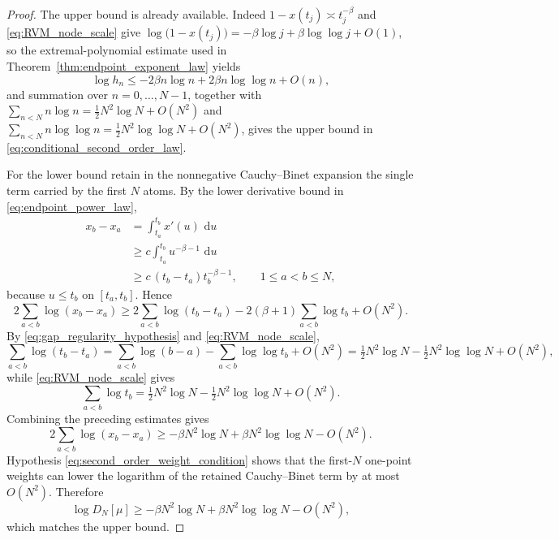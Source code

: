 \documentclass[11pt]{amsart}
\numberwithin{equation}{section}
\theoremstyle{plain}
\theoremstyle{definition}
\theoremstyle{remark}
\newcommand{\dd}{\,\mathrm d}
\begin{document}
\begin{proof}
The upper bound is already available. Indeed $1-x(t_j)\asymp t_j^{-\beta}$ and \eqref{eq:RVM_node_scale} give $\log\bigl(1-x(t_j)\bigr)=-\beta\log j+\beta\log\log j+O(1)$, so the extremal-polynomial estimate used in Theorem~\ref{thm:endpoint_exponent_law} yields
\begin{equation}
\log h_n\le-2\beta n\log n+2\beta n\log\log n+O(n),
\end{equation}
and summation over $n=0,\dots,N-1$, together with $\sum_{n<N}n\log n=\tfrac12N^2\log N+O(N^2)$ and $\sum_{n<N}n\log\log n=\tfrac12N^2\log\log N+O(N^2)$, gives the upper bound in \eqref{eq:conditional_second_order_law}.

For the lower bound retain in the nonnegative Cauchy--Binet expansion the single term carried by the first $N$ atoms.  By the lower derivative bound in \eqref{eq:endpoint_power_law},
\begin{align}
x_b-x_a
&=\int_{t_a}^{t_b}x'(u)\,\dd u\\
&\ge c\int_{t_a}^{t_b}u^{-\beta-1}\,\dd u\\
&\ge c\,(t_b-t_a)t_b^{-\beta-1},
\qquad 1\le a<b\le N,
\label{eq:second_order_node_gap_lower}
\end{align}
because $u\le t_b$ on $[t_a,t_b]$.  Hence
\begin{equation}
2\sum_{a<b}\log(x_b-x_a)
\ge
2\sum_{a<b}\log(t_b-t_a)
-2(\beta+1)\sum_{a<b}\log t_b
+O(N^2).
\label{eq:second_order_vandermonde_lower}
\end{equation}
By \eqref{eq:gap_regularity_hypothesis} and \eqref{eq:RVM_node_scale},
\begin{equation}
\sum_{a<b}\log(t_b-t_a)
=\sum_{a<b}\log(b-a)-\sum_{a<b}\log\log t_b+O(N^2)
=\tfrac12N^2\log N-\tfrac12N^2\log\log N+O(N^2),
\end{equation}
while \eqref{eq:RVM_node_scale} gives
\begin{equation}
\sum_{a<b}\log t_b=\tfrac12N^2\log N-\tfrac12N^2\log\log N+O(N^2).
\end{equation}
Combining the preceding estimates gives
\begin{equation}
2\sum_{a<b}\log(x_b-x_a)
\ge
-\beta N^2\log N+\beta N^2\log\log N-O(N^2).
\label{eq:second_order_vandermonde_final_lower}
\end{equation}
Hypothesis \eqref{eq:second_order_weight_condition} shows that the first-$N$ one-point weights can lower the logarithm of the retained Cauchy--Binet term by at most $O(N^2)$. Therefore
\begin{equation}
\log D_N[\mu]
\ge
-\beta N^2\log N+\beta N^2\log\log N-O(N^2),
\end{equation}
which matches the upper bound.


\end{proof}
\end{document}
